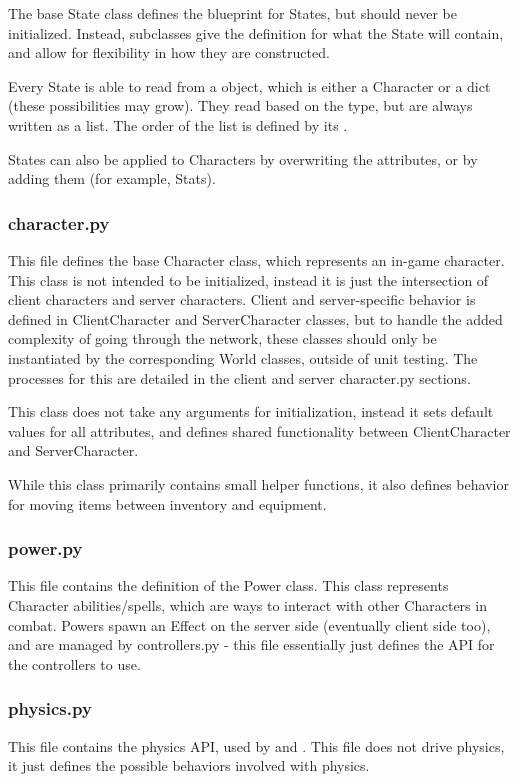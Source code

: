 \documentclass{article}
\begin{document}
The base State class defines the blueprint for States, but should never be initialized.
Instead, subclasses give the definition for what the State will contain, and
allow for flexibility in how they are constructed.

Every State is able to read from a  object, which is either a Character
or a dict (these possibilities may grow). They read based on the type, but are always
written as a list. The order of the list is defined by its .

States can also be applied to Characters by overwriting the attributes, or by adding them
(for example, Stats).
\subsubsection{character.py}
This file defines the base Character class, which represents an in-game character.
This class is not intended to be initialized, instead it is just the intersection of
client characters and server characters. Client and server-specific behavior is defined
in ClientCharacter and ServerCharacter classes, but to handle the added complexity of
going through the network, these classes should only be instantiated by the corresponding
World classes, outside of unit testing. The processes for this are detailed in the client
and server character.py sections.

This class does not take any arguments for initialization, instead it sets default values for
all attributes, and defines shared functionality between ClientCharacter and ServerCharacter.

While this class primarily contains small helper functions, it also defines behavior for
moving items between inventory and equipment.
\subsubsection{power.py}
This file contains the definition of the Power class. This class represents Character
abilities/spells, which are ways to interact with other Characters in combat.
Powers spawn an Effect on the server side (eventually client side too), and are
managed by controllers.py - this file essentially just defines the API for the
controllers to use.
\subsubsection{physics.py}
This file contains the physics API, used by  and
. This file does not drive physics, it just defines the possible
behaviors involved with physics.
\end{document}
